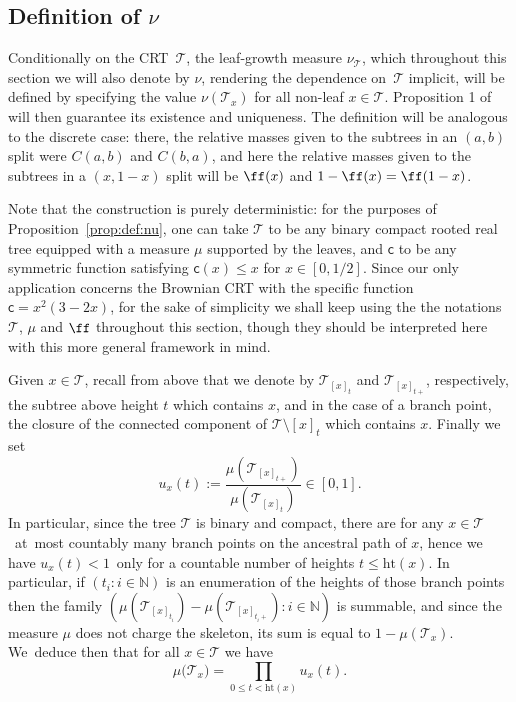 \documentclass[JEP,XML,SOM,Unicode,NoFloatCountersInSection, NoEqCountersInSection,published]{cedram}
\newcommand{\T}{\mathcal{T}}\let\CRT\T\let\tbr\T
\newcommand{\h}{\mathrm{ht}}
\theoremstyle{definition}
\begin{document}
\subsection{Definition of $\nu$}
Conditionally on the CRT~$\mathcal{T}$, the leaf-growth measure $\nu_{\mathcal{T}}$, which throughout this section we will also denote by $\nu$, rendering the dependence on~$\mathcal{T}$ implicit, will be defined by specifying the value $\nu(\T_x)$ for all non-leaf $x\in\T$. Proposition 1 of \cite{Steph13} will then guarantee its existence and uniqueness. The definition will be analogous to the discrete case: there, the relative masses given to the subtrees in an $(a,b)$ split were $C(a,b)$ and $C(b,a)$, and here the relative masses given to the subtrees in a $(x,1-x)$ split will be $\ff(x)$ and $1-\ff(x)=\ff(1-x)$.

Note that the construction is purely deterministic: for the purposes of Proposition~\ref{prop:def:nu}, one can take $\T$ to be any binary compact rooted real tree equipped with a measure $\mu$ supported by the leaves, and $ \mathsf{c}$ to be any symmetric function satisfying $ \mathsf{c}(x) \leq x$ for $x \in [0,1/2]$. Since our only application concerns the Brownian CRT with the specific function $\mathsf{c}=x^2(3-2x)$, for the sake of simplicity we shall keep using the the notations $\mathcal{T}$, $\mu$ and $\ff$ throughout this section, though they should be interpreted here with this more general framework in mind.

Given $x \in \T$, recall from above that we denote by $ \mathcal{T}_{[x]_t}$ and $\mathcal{T}_{[x]_{t+}}$, respectively, the subtree above height $t$ which contains $x$, and in the case of a branch point, the closure of the connected component of $\T\setminus{[x]_t}$ which contains $x$. Finally we set
\[
u_x(t) := \frac{\mu(\T_{[x]_{t+}})}{ \mu(\T_{[x]_t})} \in [0,1].
\]
In particular, since the tree $ \mathcal{T}$ is binary and compact, there are for any \hbox{$x \in \T$}~at~most countably many branch points on the ancestral path of $x$, hence we have \hbox{$u_x(t) < 1$}~only for a countable number of heights $t \leq \h(x)$. In particular, if $(t_i : i \in \mathbb{N})$ is an enumeration of the heights of those branch points then the family \hbox{$ (\mu(\mathcal{T}_{[x]_{t_i}})-\mu(\mathcal{T}_{[x]_{t_i +}}): i \in \mathbb{N})$} is summable, and since the measure $\mu$ does not charge the skeleton, its sum is equal to $1- \mu(\mathcal{T}_x)$. We~deduce then that for all $x \in \T$ we have
\begin{equation} \mu\big(\T_x\big) = \prod_{0 \leq t < \h(x)} u_x(t). \label{eq:noloss}\end{equation}
\end{document}
